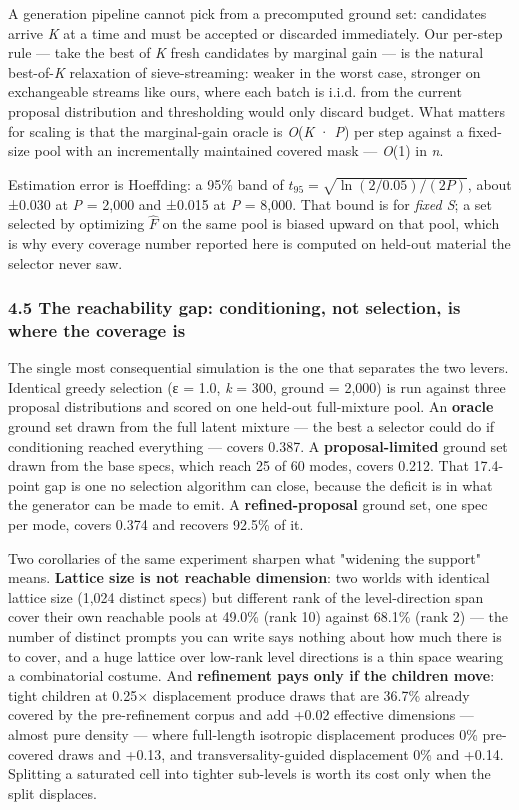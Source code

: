 \documentclass[
  10pt,
]{article}
\theoremstyle{plain}
\theoremstyle{definition}
\begin{document}
A generation pipeline cannot pick from a precomputed ground set:
candidates arrive \emph{K} at a time and must be accepted or discarded
immediately. Our per-step rule --- take the best of \emph{K} fresh
candidates by marginal gain --- is the natural best-of-\emph{K}
relaxation of sieve-streaming: weaker in the worst case, stronger on
exchangeable streams like ours, where each batch is i.i.d. from the
current proposal distribution and thresholding would only discard
budget. What matters for scaling is that the marginal-gain oracle is
\emph{O}(\emph{K} · \emph{P}) per step against a fixed-size pool with an
incrementally maintained covered mask --- \emph{O}(1) in \emph{n}.

Estimation error is Hoeffding: a 95\% band of
\(t_{95} = \sqrt{\ln(2/0.05)/(2P)}\), about ±0.030 at \emph{P} = 2,000
and ±0.015 at \emph{P} = 8,000. That bound is for \emph{fixed S}; a set
selected by optimizing \(\hat F\) on the same pool is biased upward on
that pool, which is why every coverage number reported here is computed
on held-out material the selector never saw.

\subsubsection{4.5 The reachability gap: conditioning, not selection, is
where the coverage
is}\label{45-the-reachability-gap-conditioning-not-selection-is-where-the-coverage-is}

The single most consequential simulation is the one that separates the
two levers. Identical greedy selection (ε = 1.0, \emph{k} = 300,
\textbar ground\textbar{} = 2,000) is run against three proposal
distributions and scored on one held-out full-mixture pool. An
\textbf{oracle} ground set drawn from the full latent mixture --- the
best a selector could do if conditioning reached everything --- covers
0.387. A \textbf{proposal-limited} ground set drawn from the base specs,
which reach 25 of 60 modes, covers 0.212. That 17.4-point gap is one no
selection algorithm can close, because the deficit is in what the
generator can be made to emit. A \textbf{refined-proposal} ground set,
one spec per mode, covers 0.374 and recovers 92.5\% of it.

Two corollaries of the same experiment sharpen what "widening the
support" means. \textbf{Lattice size is not reachable dimension}: two
worlds with identical lattice size (1,024 distinct specs) but different
rank of the level-direction span cover their own reachable pools at
49.0\% (rank 10) against 68.1\% (rank 2) --- the number of distinct
prompts you can write says nothing about how much there is to cover, and
a huge lattice over low-rank level directions is a thin space wearing a
combinatorial costume. And \textbf{refinement pays only if the children
move}: tight children at 0.25× displacement produce draws that are
36.7\% already covered by the pre-refinement corpus and add +0.02
effective dimensions --- almost pure density --- where full-length
isotropic displacement produces 0\% pre-covered draws and +0.13, and
transversality-guided displacement 0\% and +0.14. Splitting a saturated
cell into tighter sub-levels is worth its cost only when the split
displaces.
\end{document}
